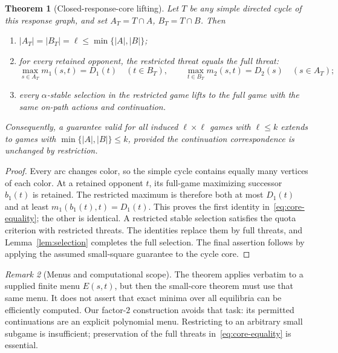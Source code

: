 \documentclass[11pt]{article}
\newtheorem{theorem}{Theorem}[section]
\theoremstyle{definition}
\theoremstyle{remark}
\newtheorem{remark}[theorem]{Remark}
\begin{document}
\begin{theorem}[Closed-response-core lifting]\label{thm:core}
Let $T$ be any simple directed cycle of this response graph, and set $A_T=T\cap A$, $B_T=T\cap B$. Then
\begin{enumerate}
\item $|A_T|=|B_T|=\ell\le\min\{|A|,|B|\}$;
\item for every retained opponent, the restricted threat equals the full threat:
\begin{equation}\label{eq:core-equality}
 \max_{s\in A_T}m_1(s,t)=D_1(t)\quad(t\in B_T),\qquad
 \max_{t\in B_T}m_2(s,t)=D_2(s)\quad(s\in A_T);
\end{equation}
\item every $\alpha$-stable selection in the restricted game lifts to the full game with the same on-path actions and continuation.
\end{enumerate}
Consequently, a guarantee valid for all induced $\ell\times\ell$ games with $\ell\le k$ extends to games with $\min\{|A|,|B|\}\le k$, provided the continuation correspondence is unchanged by restriction.
\end{theorem}
\begin{proof}
Every arc changes color, so the simple cycle contains equally many vertices of each color. At a retained opponent $t$, its full-game maximizing successor $b_1(t)$ is retained. The restricted maximum is therefore both at most $D_1(t)$ and at least $m_1(b_1(t),t)=D_1(t)$. This proves the first identity in~\eqref{eq:core-equality}; the other is identical. A restricted stable selection satisfies the quota criterion with restricted threats. The identities replace them by full threats, and Lemma~\ref{lem:selection} completes the full selection. The final assertion follows by applying the assumed small-square guarantee to the cycle core.
\end{proof}

\begin{remark}[Menus and computational scope]
The theorem applies verbatim to a supplied finite menu $E(s,t)$, but then the small-core theorem must use that same menu. It does not assert that exact minima over all equilibria can be efficiently computed. Our factor-$2$ construction avoids that task: its permitted continuations are an explicit polynomial menu. Restricting to an arbitrary small subgame is insufficient; preservation of the full threats in~\eqref{eq:core-equality} is essential.
\end{remark}
\end{document}
